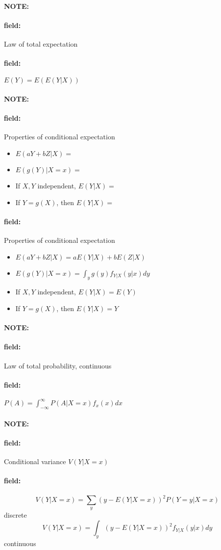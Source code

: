 \documentclass[12pt]{article}
\newenvironment{note}{\paragraph{NOTE:}}{}
\newenvironment{field}{\paragraph{field:}}{}
\begin{document}
\begin{note}
  \begin{field}
    Law of total expectation
  \end{field}
  \begin{field}
    $E(Y) = E(E(Y|X))$
  \end{field}
\end{note}

\begin{note}
  \begin{field}
    Properties of conditional expectation
    \begin{itemize}
      \item $E(aY + bZ | X) = $
      \item $E(g(Y)|X=x) = $
      \item If $X,Y$ independent, $E(Y|X) = $
      \item If $Y = g(X)$, then $E(Y|X) = $
    \end{itemize}
  \end{field}
  \begin{field}
    Properties of conditional expectation
    \begin{itemize}
      \item $E(aY + bZ | X) = a E(Y|X) + bE(Z|X)$
      \item $E(g(Y)|X=x) = \int_y g(y) f_{Y|X}(y|x)dy$
      \item If $X,Y$ independent, $E(Y|X) = E(Y)$
      \item If $Y = g(X)$, then $E(Y|X) = Y$
    \end{itemize}
  \end{field}
\end{note}

\begin{note}
  \begin{field}
    Law of total probability, continuous
  \end{field}
  \begin{field}
    $P(A) = \int_{-\infty}^\infty P(A|X=x)f_x(x)dx$
  \end{field}
\end{note}

\begin{note}
  \begin{field}
    Conditional variance $V(Y|X = x)$
  \end{field}
  \begin{field}
    $$V(Y|X = x) = \sum_y (y - E(Y|X=x))^2P(Y=y|X=x)$$ discrete
    $$V(Y|X = x) = \int_y (y - E(Y|X=x))^2 f_{Y|X}(y|x)dy$$ continuous
  \end{field}
\end{note}
\end{document}
